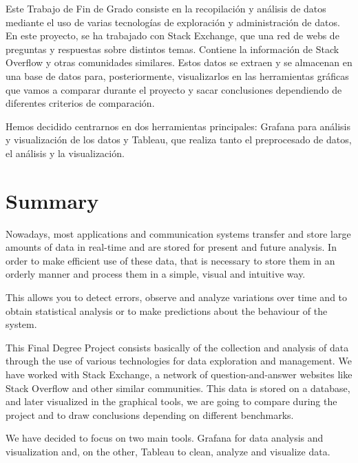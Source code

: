 \documentclass[a4paper, 12pt]{book}
\begin{document}
Este Trabajo de Fin de Grado consiste en la recopilación y análisis de datos mediante el uso de varias tecnologías de exploración y administración de datos. En este proyecto, se ha trabajado con Stack Exchange, que una red de webs de preguntas y respuestas sobre distintos temas. Contiene la información de Stack Overflow y otras comunidades similares. Estos datos se extraen y se almacenan en una base de datos para, posteriormente, visualizarlos en las herramientas gráficas que vamos a comparar durante el proyecto y sacar conclusiones dependiendo de diferentes criterios de comparación.

Hemos decidido centrarnos en dos herramientas principales: Grafana para análisis y visualización de los datos y Tableau, que realiza tanto el preprocesado de datos, el análisis y la visualización.


\chapter*{Summary}

Nowadays, most applications and communication systems transfer and store large amounts of data in real-time and are stored for present and future analysis. 
In order to make efficient use of these data, that is necessary to store them in an orderly manner and process them in a simple, visual and intuitive way.

This allows you to detect errors, observe and analyze variations over time and to obtain statistical analysis or to make predictions about the behaviour of the system.

This Final Degree Project consists basically of the collection and analysis of data through the use of various technologies for data exploration and management. We have worked with Stack Exchange, a network of question-and-answer websites like Stack Overflow and other similar communities. This data is stored on a database, and later visualized in the graphical tools, we are going to compare during the project and to draw conclusions depending on different benchmarks.

We have decided to focus on two main tools. Grafana for data analysis and visualization and, on the other, Tableau to clean, analyze and visualize data.
\end{document}
